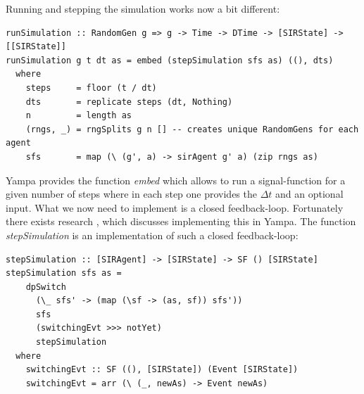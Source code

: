 Running and stepping the simulation works now a bit different:

\begin{verbatim}
runSimulation :: RandomGen g => g -> Time -> DTime -> [SIRState] -> [[SIRState]]
runSimulation g t dt as = embed (stepSimulation sfs as) ((), dts)
  where
    steps     = floor (t / dt)
    dts       = replicate steps (dt, Nothing)
    n         = length as
    (rngs, _) = rngSplits g n [] -- creates unique RandomGens for each agent
    sfs       = map (\ (g', a) -> sirAgent g' a) (zip rngs as)
\end{verbatim}

Yampa provides the function \textit{embed} which allows to run a signal-function for a given number of steps where in each step one provides the $\Delta t$ and an optional input. What we now need to implement is a closed feedback-loop. Fortunately there exists research \cite{nilsson_functional_2002}, \cite{courtney_yampa_2003} which discusses implementing this in Yampa. The function \textit{stepSimulation} is an implementation of such a closed feedback-loop:

\begin{verbatim}
stepSimulation :: [SIRAgent] -> [SIRState] -> SF () [SIRState]
stepSimulation sfs as =
    dpSwitch
      (\_ sfs' -> (map (\sf -> (as, sf)) sfs'))
      sfs
      (switchingEvt >>> notYet) 
      stepSimulation
  where
    switchingEvt :: SF ((), [SIRState]) (Event [SIRState])
    switchingEvt = arr (\ (_, newAs) -> Event newAs)
\end{verbatim}

